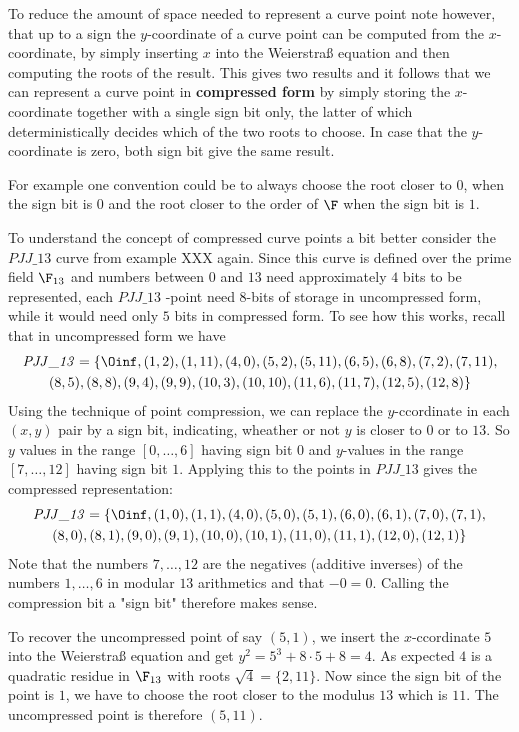 To reduce the amount of space needed to represent a curve point note however, that up to a sign the $y$-coordinate of a curve point can be computed from the $x$-coordinate, by simply inserting $x$ into the Weierstraß equation and then computing the roots of the result. This gives two results and it follows that we can represent a curve point in \textbf{compressed form} by simply storing the $x$-coordinate together with a single sign bit only, the latter of which deterministically decides which of the two roots to choose. In case that the $y$-coordinate is zero, both sign bit give the same result.

For example one convention could be to always choose the root closer to $0$, when the sign bit is $0$ and the root closer to the order of $\F$ when the sign bit is $1$.

\begin{example} To understand the concept of compressed curve points a bit better consider the $\mathit{PJJ\_13}$ curve from example XXX again. Since this curve is defined over the prime field $\F_{13}$ and numbers between $0$ and $13$ need approximately $4$ bits to be represented, each $\mathit{PJJ\_13}$ -point need $8$-bits of storage in uncompressed form, while it would need only $5$ bits in compressed form. To see how this works, recall that in uncompressed form we have
\begin{multline*}
\mathit{PJJ\_13} = \{\Oinf, (1, 2), (1, 11), (4, 0), (5, 2), (5, 11), (6, 5), (6, 8), (7,2), (7, 11), \\ (8, 5), (8, 8), (9, 4), (9, 9), (10, 3), (10,
10), (11, 6), (11, 7), (12, 5), (12, 8)\}
\end{multline*}
Using the technique of point compression, we can replace the $y$-ccordinate in each $(x,y)$ pair by a sign bit, indicating, wheather or not $y$ is closer to $0$ or to $13$. So $y$ values in the range $[0,\ldots,6]$ having sign bit $0$ and $y$-values in the range $[7,\ldots,12]$ having sign bit $1$. Applying this to the points in $\mathit{PJJ\_13}$ gives the compressed representation:
\begin{multline*}
\mathit{PJJ\_13} = \{\Oinf, (1, 0), (1, 1), (4, 0), (5, 0), (5, 1), (6, 0), (6, 1), (7,0), (7, 1), \\ (8, 0), (8, 1), (9, 0), (9, 1), (10, 0), (10,1), (11, 0), (11, 1), (12, 0), (12, 1)\}
\end{multline*} 
Note that the numbers $7,\ldots, 12$ are the negatives (additive inverses) of the numbers $1,\ldots, 6$ in modular $13$ arithmetics and that $-0=0$. Calling the compression bit a "sign bit" therefore makes sense.

To recover the uncompressed point of say $(5,1)$, we insert the $x$-ccordinate $5$ into the Weierstraß equation and get $y^2 = 5^3 + 8\cdot 5 +8 = 4$. As expected $4$ is a quadratic residue in $\F_{13}$ with roots $\sqrt{4}= \{2,11\}$. Now since the sign bit of the point is $1$, we have to choose the root closer to the modulus $13$ which is $11$. The uncompressed point is therefore $(5,11)$. 
\end{example}
